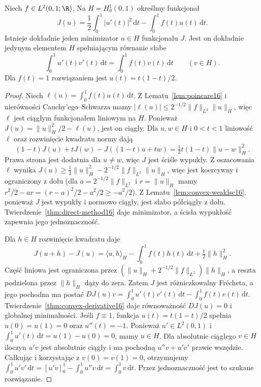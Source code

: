\begin{twierdzenie}
\label{thm:dirichlet16}
Niech $f\in L^2(0,1;\R)$. Na $H=H_0^1(0,1)$
określmy funkcjonał
\[
J(u)=\frac12\int_0^1|u'(t)|^2\,\mathrm dt
-\int_0^1 f(t)u(t)\,\mathrm dt.
\]
Istnieje dokładnie jeden minimizator $u\in H$ funkcjonału $J$.
Jest on dokładnie jedynym elementem $H$ spełniającym
równanie słabe
\[
\int_0^1u'(t)v'(t)\,\mathrm dt
=\int_0^1f(t)v(t)\,\mathrm dt\qquad(v\in H).
\]
Dla $f(t)=1$ rozwiązaniem jest $u(t)=t(1-t)/2$.
\end{twierdzenie}
\begin{proof}
Niech $\ell(u)=\int_0^1 f(t)u(t)\,\mathrm dt$.
Z Lematu~\ref{lem:poincare16} i nierówności Cauchy'ego--Schwarza
mamy $|\ell(u)|\le2^{-1/2}\|f\|_{L^2}\|u\|_H$,
więc $\ell$ jest ciągłym funkcjonałem liniowym na $H$.
Ponieważ $J(u)=\|u\|_H^2/2-\ell(u)$, jest on ciągły.
Dla $u,w\in H$ i $0<t<1$ liniowość $\ell$ oraz
rozwinięcie kwadratu normy dają
\[
(1-t)J(u)+tJ(w)-J((1-t)u+tw)
=\tfrac12t(1-t)\|u-w\|_H^2.
\]
Prawa strona jest dodatnia dla $u\ne w$, więc $J$
jest ściśle wypukły. Z oszacowania $\ell$ wynika
$J(u)\ge\frac12\|u\|_H^2-
2^{-1/2}\|f\|_{L^2}\|u\|_H$, więc jest koercywny
i ograniczony z dołu (dla $a=2^{-1/2}\|f\|_{L^2}$
i $r=\|u\|_H$ mamy $r^2/2-ar=(r-a)^2/2-a^2/2\ge-a^2/2$).
Z Lematu~\ref{lem:convex-weaklsc16}, ponieważ $J$ jest
wypukły i normowo ciągły, jest słabo półciągły z dołu.
Twierdzenie~\ref{thm:direct-method16} daje minimizator,
a ścisła wypukłość zapewnia jego jednoznaczność.

Dla $h\in H$ rozwinięcie kwadratu daje
\[
J(u+h)-J(u)=\langle u,h\rangle_H-\int_0^1 f(t)h(t)\,\mathrm dt
+\tfrac12\|h\|_H^2.
\]
Część liniowa jest ograniczona przez
$(\|u\|_H+2^{-1/2}\|f\|_{L^2})\|h\|_H$,
a reszta podzielona przez $\|h\|_H$ dąży do zera.
Zatem $J$ jest różniczkowalny Frécheta, a jego pochodna ma postać
$DJ(u)v=\int_0^1u'(t)v'(t)\,\mathrm dt-
\int_0^1 f(t)v(t)\,\mathrm dt$.
Twierdzenie~\ref{thm:convex-derivative16} daje
równoważność $DJ(u)=0$ i globalnej minimalności.
Jeśli $f\equiv1$, funkcja $u(t)=t(1-t)/2$ spełnia
$u(0)=u(1)=0$ oraz $u''(t)=-1$. Ponieważ $u'\in L^2(0,1)$
i $\int_0^1u'(t)\,\mathrm dt=u(1)-u(0)=0$, mamy $u\in H$.
Dla absolutnie ciągłego $v\in H$ iloczyn $u'v$ jest
absolutnie ciągły i ma pochodną $u''v+u'v'$ prawie wszędzie.
Całkując i korzystając z $v(0)=v(1)=0$, otrzymujemy
$\int_0^1u'v'\,\mathrm dt=[u'v]_0^1-\int_0^1u''v\,\mathrm dt
=\int_0^1v\,\mathrm dt$.
Przez jednoznaczność jest to szukane rozwiązanie.
\end{proof}

